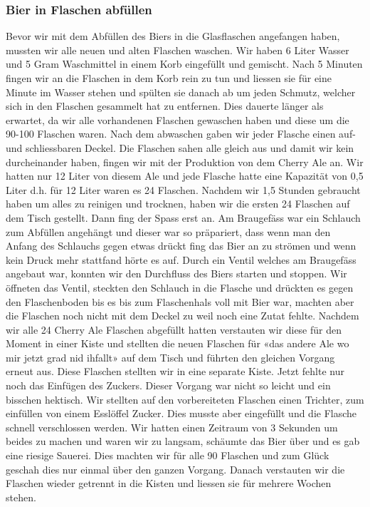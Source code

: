 \subsubsection{Bier in Flaschen abfüllen}
Bevor wir mit dem Abfüllen des Biers in die Glasflaschen angefangen haben, mussten wir alle neuen und alten Flaschen waschen. Wir haben 6 Liter Wasser und 5 Gram Waschmittel in einem Korb eingefüllt und gemischt. Nach 5 Minuten fingen wir an die Flaschen in dem Korb rein zu tun und liessen sie für eine Minute im Wasser stehen und spülten sie danach ab um jeden Schmutz, welcher sich in den Flaschen gesammelt hat zu entfernen. Dies dauerte länger als erwartet, da wir alle vorhandenen Flaschen gewaschen haben und diese um die 90-100 Flaschen waren. Nach dem abwaschen gaben wir jeder Flasche einen auf- und schliessbaren Deckel. Die Flaschen sahen alle gleich aus und damit wir kein durcheinander haben, fingen wir mit der Produktion von dem Cherry Ale an. Wir hatten nur 12 Liter von diesem Ale und jede Flasche hatte eine Kapazität von 0,5 Liter d.h. für 12 Liter waren es 24 Flaschen. Nachdem wir 1,5 Stunden gebraucht haben um alles zu reinigen und trocknen, haben wir die ersten 24 Flaschen auf dem Tisch gestellt. Dann fing der Spass erst an. Am Braugefäss war ein Schlauch zum Abfüllen angehängt und dieser war so präpariert, dass wenn man den Anfang des Schlauchs gegen etwas drückt fing das Bier an zu strömen und wenn kein Druck mehr stattfand hörte es auf. Durch ein Ventil welches am Braugefäss angebaut war, konnten wir den Durchfluss des Biers starten und stoppen.
Wir öffneten das Ventil, steckten den Schlauch in die Flasche und drückten es gegen den Flaschenboden bis es bis zum Flaschenhals voll mit Bier war, machten aber die Flaschen noch nicht mit dem Deckel zu weil noch eine Zutat fehlte. Nachdem wir alle 24 Cherry Ale Flaschen abgefüllt hatten verstauten wir diese für den Moment in einer Kiste und stellten die neuen Flaschen für «das andere Ale wo mir jetzt grad nid ihfallt» auf dem Tisch und führten den gleichen Vorgang erneut aus. Diese Flaschen stellten wir in eine separate Kiste. Jetzt fehlte nur noch das Einfügen des Zuckers. Dieser Vorgang war nicht so leicht und ein bisschen hektisch. Wir stellten auf den vorbereiteten Flaschen einen Trichter, zum einfüllen von einem Esslöffel Zucker. Dies musste aber eingefüllt und die Flasche schnell verschlossen werden. Wir hatten einen Zeitraum von 3 Sekunden um beides zu machen und waren wir zu langsam, schäumte das Bier über und es gab eine riesige Sauerei. Dies machten wir für alle 90 Flaschen und zum Glück geschah dies nur einmal über den ganzen Vorgang. Danach verstauten wir die Flaschen wieder getrennt in die Kisten und liessen sie für mehrere Wochen stehen.
